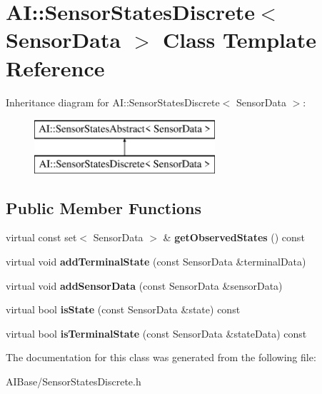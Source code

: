 \hypertarget{classAI_1_1SensorStatesDiscrete}{\section{A\-I\-:\-:Sensor\-States\-Discrete$<$ Sensor\-Data $>$ Class Template Reference}
\label{classAI_1_1SensorStatesDiscrete}
}
Inheritance diagram for A\-I\-:\-:Sensor\-States\-Discrete$<$ Sensor\-Data $>$\-:\begin{figure}[H]
\begin{center}
\leavevmode
\includegraphics[height=2.000000cm]{classAI_1_1SensorStatesDiscrete}
\end{center}
\end{figure}
\subsection*{Public Member Functions}
\begin{DoxyCompactItemize}
\item 
\hypertarget{classAI_1_1SensorStatesDiscrete_aeb2b38b57ad145e493ac6bf1ea2b81c7}{virtual const set$<$ Sensor\-Data $>$ \& {\bfseries get\-Observed\-States} () const }\label{classAI_1_1SensorStatesDiscrete_aeb2b38b57ad145e493ac6bf1ea2b81c7}

\item 
\hypertarget{classAI_1_1SensorStatesDiscrete_a9cfe2e27f781fb832178dd9f773c535b}{virtual void {\bfseries add\-Terminal\-State} (const Sensor\-Data \&terminal\-Data)}\label{classAI_1_1SensorStatesDiscrete_a9cfe2e27f781fb832178dd9f773c535b}

\item 
\hypertarget{classAI_1_1SensorStatesDiscrete_a1508148bc519dd888f778599c8b6ec8f}{virtual void {\bfseries add\-Sensor\-Data} (const Sensor\-Data \&sensor\-Data)}\label{classAI_1_1SensorStatesDiscrete_a1508148bc519dd888f778599c8b6ec8f}

\item 
\hypertarget{classAI_1_1SensorStatesDiscrete_a85889d75b392990aeb439515398ceef4}{virtual bool {\bfseries is\-State} (const Sensor\-Data \&state) const }\label{classAI_1_1SensorStatesDiscrete_a85889d75b392990aeb439515398ceef4}

\item 
\hypertarget{classAI_1_1SensorStatesDiscrete_a63b932c42db361413fe590f959a0344d}{virtual bool {\bfseries is\-Terminal\-State} (const Sensor\-Data \&state\-Data) const }\label{classAI_1_1SensorStatesDiscrete_a63b932c42db361413fe590f959a0344d}

\end{DoxyCompactItemize}


The documentation for this class was generated from the following file\-:\begin{DoxyCompactItemize}
\item 
A\-I\-Base/Sensor\-States\-Discrete.\-h\end{DoxyCompactItemize}
